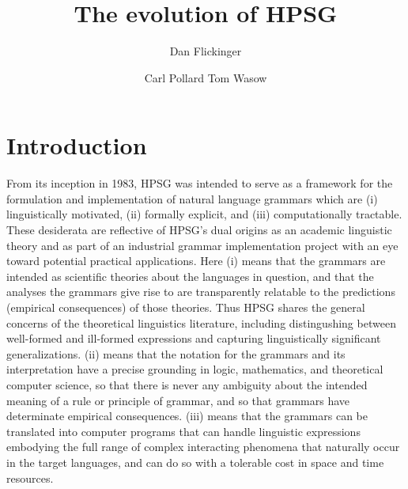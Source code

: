 \documentclass[output=paper]{langsci/langscibook}
\title{The evolution of HPSG}
\author{%
	Dan Flickinger\affiliation{Stanford University}%
	\and Carl Pollard\affiliation{Ohio State Universtiy}
	\lastand Tom Wasow\affiliation{Stanford University}%
}
\begin{document}
\label{chap-evolution}


\section*{Introduction} 

From its inception in 1983, HPSG was intended to serve as a framework for the formulation and implementation of natural language grammars which are (i) linguistically motivated, (ii)
formally explicit, and (iii) computationally tractable. These desiderata are reflective of HPSG's dual origins as an academic linguistic theory and as part of an industrial grammar implementation project with an eye toward potential practical applications. Here (i) means that the grammars are intended as scientific theories about the languages in question, and that the analyses the grammars give rise to are transparently relatable to the predictions (empirical consequences) of those theories. Thus HPSG shares the general concerns
of the theoretical linguistics literature, including distingushing between well-formed and ill-formed expressions and capturing
linguistically significant generalizations.  (ii) means that the notation for the grammars and its interpretation have a precise grounding in logic, mathematics, and theoretical computer science, so that there is never any ambiguity about the intended meaning of a rule or principle of grammar, and so that grammars have determinate empirical consequences. (iii) means that the grammars can be translated into computer programs that can handle linguistic
expressions embodying the full range of complex interacting phenomena that naturally occur in the target languages, and can do so with a
tolerable cost in space and time resources.

\end{document}
